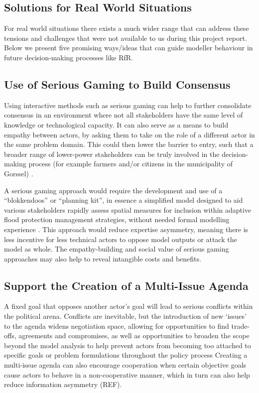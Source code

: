 \subsection{Solutions for Real World Situations }

For real world situations there exists a much wider range that can address these tensions and challenges that were not available to us during this project report. Below we present five promising ways/ideas that can guide modeller behaviour in future decision-making processes like RfR.

\subsection{Use of Serious Gaming to Build Consensus}

Using interactive methods such as serious gaming can help to further consolidate consensus in an environment where not all stakeholders have the same level of knowledge or technological capacity. It can also serve as a means to build empathy between actors, by asking them to take on the role of a different actor in the same problem domain. This could then lower the barrier to entry, such that a broader range of lower-power stakeholders can be truly involved in the decision-making process (for example farmers and/or citizens in the municipality of Gorssel) \parencite{savic_serious_2016}.

A serious gaming approach would require the development and use of a “blokkendoos” or “planning kit”, in essence a simplified model designed to aid various stakeholders rapidly assess spatial measures for inclusion within adaptive flood protection management strategies, without needed formal modelling experience \parencite{warren_collaborative_2015}. This approach would reduce expertise asymmetry, meaning there is less incentive for less technical actors to oppose model outputs or attack the model as whole. The empathy-building and social value of serious gaming approaches may also help to reveal intangible costs and benefits. 

\subsection{Support the Creation of a Multi-Issue Agenda} 

A fixed goal that opposes another actor’s goal will lead to serious conflicts within the political arena. Conflicts are inevitable, but the introduction of new ‘issues’ to the agenda widens negotiation space, allowing for opportunities to find trade-offs, agreements and compromises, as well as opportunities to broaden the scope beyond the model analysis to help prevent actors from becoming too attached to specific goals or problem formulations throughout the policy process \parencite{hans_de_bruijn_mark_de_bruijne_ernst_ten_heuvelhof_politics_2015} Creating a multi-issue agenda can also encourage cooperation when certain objective goals cause actors to behave in a non-cooperative manner, which in turn can also help reduce information asymmetry (REF).

